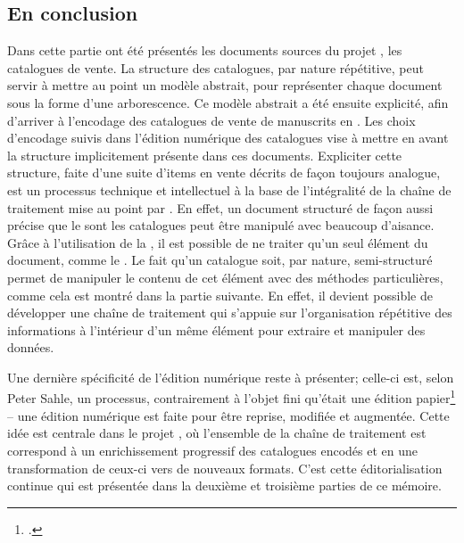 \subsection{En conclusion}
Dans cette partie ont été présentés les documents sources du projet \mssktb{}, les catalogues de vente. La structure des catalogues, par nature répétitive, peut servir à mettre au point un modèle abstrait, pour représenter chaque document sous la forme d'une arborescence. Ce modèle abstrait a été ensuite explicité, afin d'arriver à l'encodage des catalogues de vente de manuscrits en \xmltei{}. Les choix d'encodage suivis dans l'édition numérique des catalogues vise à mettre en avant la structure implicitement présente dans ces documents. Expliciter cette structure, faite d'une suite d'items en vente décrits de façon toujours analogue, est un processus technique et intellectuel à la base de l'intégralité de la chaîne de traitement mise au point par \mssktb{}. En effet, un document structuré de façon aussi précise que le sont les catalogues peut être manipulé avec beaucoup d'aisance. Grâce à l'utilisation de la \tei{}, il est possible de ne traiter qu'un seul élément du document, comme le \tname{}. Le fait qu'un catalogue soit, par nature, semi-structuré permet de manipuler le contenu de cet élément avec des méthodes particulières, comme cela est montré dans la partie suivante. En effet, il devient possible de développer une chaîne de traitement qui s'appuie sur l'organisation répétitive des informations à l'intérieur d'un même élément pour extraire et manipuler des données.

Une dernière spécificité de l'édition numérique reste à présenter; celle-ci est, selon Peter Sahle, un processus, contrairement à l'objet fini qu'était une édition papier\footcite{sahle_digital_2016} -- une édition numérique est faite pour être reprise, modifiée et augmentée. Cette idée est centrale dans le projet \ktb{}, où l'ensemble de la chaîne de traitement est correspond à un enrichissement progressif des catalogues encodés et en une transformation de ceux-ci vers de nouveaux formats. C'est cette éditorialisation continue qui est présentée dans la deuxième et troisième parties de ce mémoire.